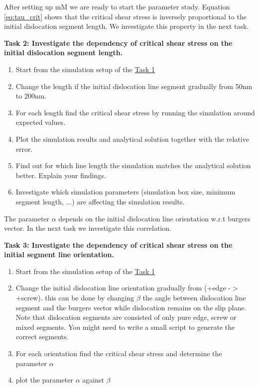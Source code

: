 After setting up mM we are ready to start the parameter study. Equation \ref{eq:tau_crit} shows that the critical shear stress is inversely proportional to the initial dislocation segment length. We investigate this property in the next task.

\begin{tcolorbox}[colback=white,colframe=black,sharp corners,boxrule=0.5pt]
\textbf{Task 2: Investigate the dependency of critical shear stress on the initial dislocation segment length.}
\begin{enumerate}
    \item Start from the simulation setup of the \hyperlink{task1}{Task 1}
    \item Change the length if the initial dislocation line segment gradually from 50nm to 200nm.
    \item For each length find the critical shear stress by running the simulation around expected values.
    \item Plot the simulation results and analytical solution together with the relative error.
    \item Find out for which line length the simulation matches the analytical solution better. Explain your findings.
    \item Investigate which simulation parameters (simulation box size, minimum segment length, ...) are affecting the simulation results.
\end{enumerate}
\end{tcolorbox}

The parameter $\alpha$ depends on the initial dislocation line orientation w.r.t burgers vector. In the next task we investigate this correlation.

\begin{tcolorbox}[colback=white,colframe=black,sharp corners,boxrule=0.5pt]
\textbf{Task 3: Investigate the dependency of critical shear stress on the initial segment line orientation.}
\begin{enumerate}
    \item Start from the simulation setup of the \hyperlink{task1}{Task 1}
    \item Change the initial dislocation line orientation gradually from (+edge -$>$ +screw). this can be done by changing $\beta$ the angle between dislocation line segment and the burgers vector while dislocation remains on the slip plane. Note that dislocation segments are consisted of only pure edge, screw or mixed segments. You might need to write a small script to generate the correct segments.
    \item For each orientation find the critical shear stress and determine the parameter $\alpha$
    \item plot the parameter $\alpha$ against $\beta$
\end{enumerate}
\end{tcolorbox}

\printbibliography[title={References}]

